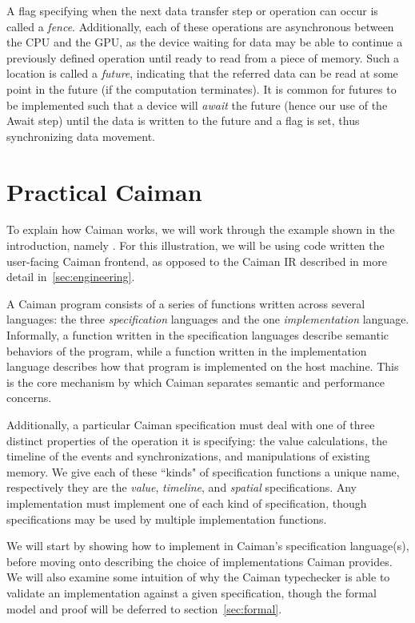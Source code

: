 A flag specifying when the next data transfer step or operation can occur is called a \emph{fence}.  Additionally, each of these operations are asynchronous between the CPU and the GPU, as the device waiting for data may be able to continue a previously defined operation until ready to read from a piece of memory.  Such a location is called a \emph{future}, indicating that the referred data can be read at some point in the future (if the computation terminates).  It is common for futures to be implemented such that a device will \emph{await} the future (hence our use of the Await step) until the data is written to the future and a flag is set, thus synchronizing data movement.

\section{Practical Caiman}
\label{sec:practical}

To explain how Caiman works, we will work through the example shown in the introduction, namely .  For this illustration, we will be using code written the user-facing Caiman frontend, as opposed to the Caiman IR described in more detail in~\ref{sec:engineering}.

A Caiman program consists of a series of functions written across several languages: the three \textit{specification} languages and the one \textit{implementation} language.  Informally, a function written in the specification languages describe semantic behaviors of the program, while a function written in the implementation language describes how that program is implemented on the host machine.  This is the core mechanism by which Caiman separates semantic and performance concerns.

Additionally, a particular Caiman specification must deal with one of three distinct properties of the operation it is specifying: the value calculations, the timeline of the events and synchronizations, and manipulations of existing memory.  We give each of these ``kinds" of specification functions a unique name, respectively they are the \textit{value}, \textit{timeline}, and \textit{spatial} specifications.  Any implementation must implement one of each kind of specification, though specifications may be used by multiple implementation functions.

We will start by showing how to implement  in Caiman's specification language(s), before moving onto describing the choice of implementations Caiman provides.  We will also examine some intuition of why the Caiman typechecker is able to validate an implementation against a given specification, though the formal model and proof will be deferred to section~\ref{sec:formal}.

